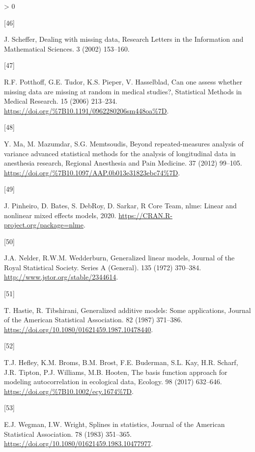 \documentclass[
]{article}
\newlength{\cslhangindent}
\newlength{\csllabelwidth}
\newenvironment{CSLReferences}[2] %
 {%
  \setlength{\parindent}{0pt}
  \ifodd #1 \everypar{\setlength{\hangindent}{\cslhangindent}}\ignorespaces\fi
  \ifnum #2 > 0
  \setlength{\parskip}{#2\baselineskip}
  \fi
 }%
 {}
\newcommand{\CSLLeftMargin}[1]{\parbox[t]{\csllabelwidth}{#1}}
\newcommand{\CSLRightInline}[1]{\parbox[t]{\linewidth - \csllabelwidth}{#1}\break}
\begin{document}
\begin{CSLReferences}{0}{0}
\leavevmode\hypertarget{ref-scheffer2002}{}%
\CSLLeftMargin{{[}46{]} }
\CSLRightInline{J. Scheffer, Dealing with missing data, Research Letters in the Information and Mathematical Sciences. 3 (2002) 153--160.}

\leavevmode\hypertarget{ref-potthoff2006}{}%
\CSLLeftMargin{{[}47{]} }
\CSLRightInline{R.F. Potthoff, G.E. Tudor, K.S. Pieper, V. Hasselblad, {Can one assess whether missing data are missing at random in medical studies?}, {Statistical Methods in Medical Research}. {15} (2006) 213--234. \url{https://doi.org/\%7B10.1191/0962280206sm448oa\%7D}.}

\leavevmode\hypertarget{ref-ma2012}{}%
\CSLLeftMargin{{[}48{]} }
\CSLRightInline{Y. Ma, M. Mazumdar, S.G. Memtsoudis, Beyond repeated-measures analysis of variance advanced statistical methods for the analysis of longitudinal data in anesthesia research, {Regional Anesthesia and Pain Medicine}. {37} (2012) 99--105. \url{https://doi.org/\%7B10.1097/AAP.0b013e31823ebc74\%7D}.}

\leavevmode\hypertarget{ref-nlme}{}%
\CSLLeftMargin{{[}49{]} }
\CSLRightInline{J. Pinheiro, D. Bates, S. DebRoy, D. Sarkar, R Core Team, {nlme}: Linear and nonlinear mixed effects models, 2020. \url{https://CRAN.R-project.org/package=nlme}.}

\leavevmode\hypertarget{ref-nelder1972}{}%
\CSLLeftMargin{{[}50{]} }
\CSLRightInline{J.A. Nelder, R.W.M. Wedderburn, Generalized linear models, Journal of the Royal Statistical Society. Series A (General). 135 (1972) 370--384. \url{http://www.jstor.org/stable/2344614}.}

\leavevmode\hypertarget{ref-hastie1987}{}%
\CSLLeftMargin{{[}51{]} }
\CSLRightInline{T. Hastie, R. Tibshirani, Generalized additive models: Some applications, Journal of the American Statistical Association. 82 (1987) 371--386. \url{https://doi.org/10.1080/01621459.1987.10478440}.}

\leavevmode\hypertarget{ref-hefley2017}{}%
\CSLLeftMargin{{[}52{]} }
\CSLRightInline{T.J. Hefley, K.M. Broms, B.M. Brost, F.E. Buderman, S.L. Kay, H.R. Scharf, J.R. Tipton, P.J. Williams, M.B. Hooten, {The basis function approach for modeling autocorrelation in ecological data}, {Ecology}. {98} (2017) 632--646. \url{https://doi.org/\%7B10.1002/ecy.1674\%7D}.}

\leavevmode\hypertarget{ref-wegman1983}{}%
\CSLLeftMargin{{[}53{]} }
\CSLRightInline{E.J. Wegman, I.W. Wright, Splines in statistics, Journal of the American Statistical Association. 78 (1983) 351--365. \url{https://doi.org/10.1080/01621459.1983.10477977}.}


\end{CSLReferences}
\end{document}
